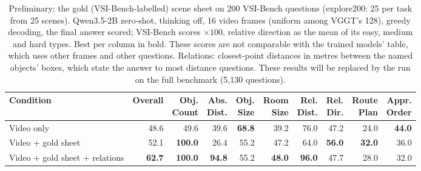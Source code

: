 \begin{table}[t]
\centering
\small
\begin{tabular}{lrrrrrrrrr}
\toprule
Condition & Overall & \shortstack[r]{Obj.\\Count} & \shortstack[r]{Abs.\\Dist.} & \shortstack[r]{Obj.\\Size} & \shortstack[r]{Room\\Size} & \shortstack[r]{Rel.\\Dist.} & \shortstack[r]{Rel.\\Dir.} & \shortstack[r]{Route\\Plan} & \shortstack[r]{Appr.\\Order} \\
\midrule
Video only & 48.6 & 49.6 & 39.6 & \textbf{68.8} & 39.2 & 76.0 & 47.2 & 24.0 & \textbf{44.0} \\
Video + gold sheet & 52.1 & \textbf{100.0} & 26.4 & 55.2 & 47.2 & 64.0 & \textbf{56.0} & \textbf{32.0} & 36.0 \\
Video + gold sheet + relations & \textbf{62.7} & \textbf{100.0} & \textbf{94.8} & 55.2 & \textbf{48.0} & \textbf{96.0} & 47.7 & 28.0 & 32.0 \\
\bottomrule
\end{tabular}
\caption{Preliminary: the gold (VSI-Bench-labelled) scene sheet on 200 VSI-Bench questions (explore200: 25 per task from 25 scenes). Qwen3.5-2B zero-shot, thinking off, 16 video frames (uniform among VGGT's 128), greedy decoding, the final answer scored; VSI-Bench scores $\times 100$, relative direction as the mean of its easy, medium and hard types. Best per column in bold. These scores are not comparable with the trained models' table, which uses other frames and other questions. Relations: closest-point distances in metres between the named objects' boxes, which state the answer to most distance questions. These results will be replaced by the run on the full benchmark (5,130 questions).}
\label{tab:gold-sheet-explore200}
\end{table}
